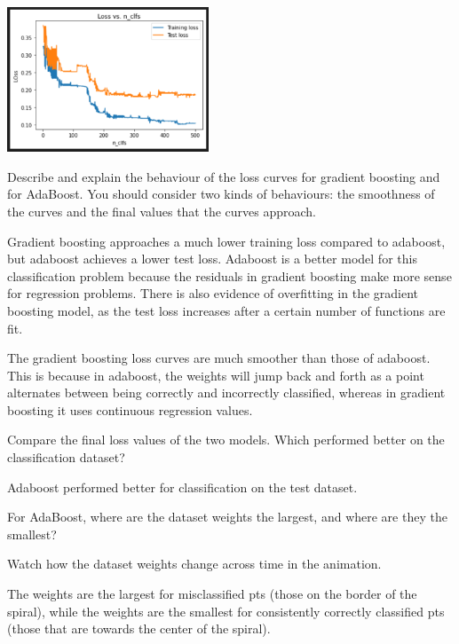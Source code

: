 \begin{solution}
\begin{center}
        \includegraphics[width=0.45\textwidth]{ada2.png}
    \end{center}
\end{solution}

\begin{problem}[2]
    Describe and explain the behaviour of the loss curves for gradient boosting and for AdaBoost. You should consider two kinds of behaviours: the smoothness of the curves and the final values that the curves approach.
\end{problem}

\begin{solution}
  Gradient boosting approaches a much lower training loss compared to adaboost, but adaboost achieves a lower test loss. Adaboost is a better model for this classification problem because the residuals in gradient boosting make more sense for regression problems. There is also evidence of overfitting in the gradient boosting model, as the test loss increases after a certain number of functions are fit.
  
  The gradient boosting loss curves are much smoother than those of adaboost. This is because in adaboost, the weights will jump back and forth as a point alternates between being correctly and incorrectly classified, whereas in gradient boosting it uses continuous regression values.
\end{solution}

\begin{problem}[2]
    Compare the final loss values of the two models. Which performed better on the classification dataset?
\end{problem}
    
\begin{solution}
    Adaboost performed better for classification on the test dataset.
\end{solution}

\begin{problem}[2]
    For AdaBoost, where are the dataset weights the largest, and where are they the smallest?
\end{problem}
\begin{hint}
    Watch how the dataset weights change across time in the animation.
\end{hint}
\begin{solution}
    The weights are the largest for misclassified pts (those on the border of the spiral), while the weights are the smallest for consistently correctly classified pts (those that are towards the center of the spiral).
\end{solution}

